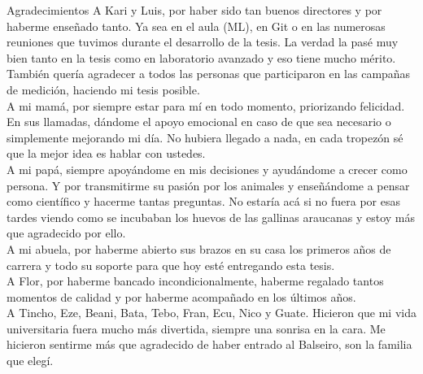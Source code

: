 \documentclass[12pt,screen,twoside,pagebackref]{ibtesis}
\begin{document}
\begin{postliminary}


\begin{seccion}{Agradecimientos}
A Kari y Luis, por haber sido tan buenos directores y por haberme enseñado tanto. Ya sea en el aula (ML), en Git o en las numerosas reuniones que tuvimos durante el desarrollo de la tesis. La verdad la pasé muy bien tanto en la tesis como en laboratorio avanzado y eso tiene mucho mérito. También quería agradecer a todos las personas que participaron en las campañas de medición, haciendo mi tesis posible. \\

A mi mamá, por siempre estar para mí en todo momento, priorizando felicidad. En sus llamadas, dándome el apoyo emocional en caso de que sea necesario o simplemente mejorando mi día. No hubiera llegado a nada, en cada tropezón sé que la mejor idea es hablar con ustedes. \\

A mi papá, siempre apoyándome en mis decisiones y ayudándome a crecer como persona. Y por transmitirme su pasión por los animales y enseñándome a pensar como científico y hacerme tantas preguntas. No estaría acá si no fuera por esas tardes viendo como se incubaban los huevos de las gallinas araucanas y estoy más que agradecido por ello. \\

A mi abuela, por haberme abierto sus brazos en su casa los primeros años de carrera y todo su soporte para que hoy esté entregando esta tesis.\\

A Flor, por haberme bancado incondicionalmente, haberme regalado tantos momentos de calidad y por haberme acompañado en los últimos años. \\

A Tincho, Eze, Beani, Bata, Tebo, Fran, Ecu, Nico y Guate. Hicieron que mi vida universitaria fuera mucho más divertida, siempre una sonrisa en la cara. Me hicieron sentirme más que agradecido de haber entrado al Balseiro, son la familia que elegí. 
\end{seccion}

\end{postliminary}
\end{document}
